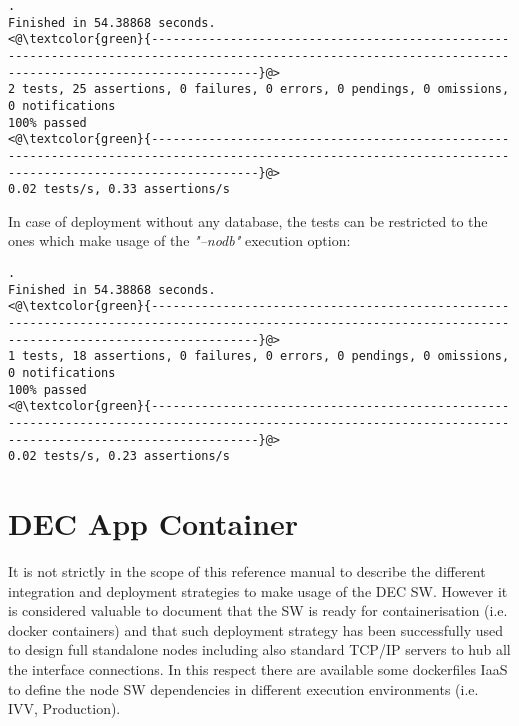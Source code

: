 \documentclass[dec_sum_main.tex]{subfiles}
\begin{document}
 \newline

\begin{lstlisting}
.
Finished in 54.38868 seconds.
<@\textcolor{green}{-----------------------------------------------------------------------------------------------------------------------------------------------------------}@>
2 tests, 25 assertions, 0 failures, 0 errors, 0 pendings, 0 omissions, 0 notifications
100% passed
<@\textcolor{green}{-----------------------------------------------------------------------------------------------------------------------------------------------------------}@>
0.02 tests/s, 0.33 assertions/s 
\end{lstlisting}

\noindent
\newline
In case of deployment without any database, the tests can be restricted to the ones which make usage of the \textit{"--nodb"} execution option:

 \newline

\begin{lstlisting}
.
Finished in 54.38868 seconds.
<@\textcolor{green}{-----------------------------------------------------------------------------------------------------------------------------------------------------------}@>
1 tests, 18 assertions, 0 failures, 0 errors, 0 pendings, 0 omissions, 0 notifications
100% passed
<@\textcolor{green}{-----------------------------------------------------------------------------------------------------------------------------------------------------------}@>
0.02 tests/s, 0.23 assertions/s
\end{lstlisting}

\section{DEC App Container}
It is not strictly in the scope of this reference manual to describe the different integration and deployment strategies to make usage of the DEC SW. However it is considered valuable to document that the SW is ready for containerisation (i.e. docker containers) and that such deployment strategy has been successfully used to design full standalone nodes including also standard TCP/IP servers to hub all the interface connections. In this respect there are available some dockerfiles IaaS to define the node SW dependencies in different execution environments (i.e. IVV, Production).
\end{document}
